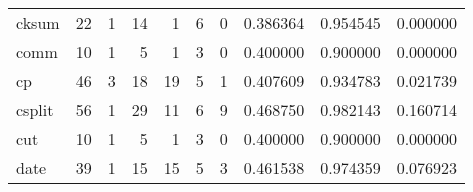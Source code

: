 \begin{longtable}{lrrrrrrrrr}
cksum     &                                       22 &                                                  1 &                                                 14 &                                                  1 &                                                  6 &                                                  0 &                                           0.386364 &                               0.954545 &                             0.000000 \\
comm      &                                       10 &                                                  1 &                                                  5 &                                                  1 &                                                  3 &                                                  0 &                                           0.400000 &                               0.900000 &                             0.000000 \\
cp        &                                       46 &                                                  3 &                                                 18 &                                                 19 &                                                  5 &                                                  1 &                                           0.407609 &                               0.934783 &                             0.021739 \\
csplit    &                                       56 &                                                  1 &                                                 29 &                                                 11 &                                                  6 &                                                  9 &                                           0.468750 &                               0.982143 &                             0.160714 \\
cut       &                                       10 &                                                  1 &                                                  5 &                                                  1 &                                                  3 &                                                  0 &                                           0.400000 &                               0.900000 &                             0.000000 \\
date      &                                       39 &                                                  1 &                                                 15 &                                                 15 &                                                  5 &                                                  3 &                                           0.461538 &                               0.974359 &                             0.076923 \\

\end{longtable}
